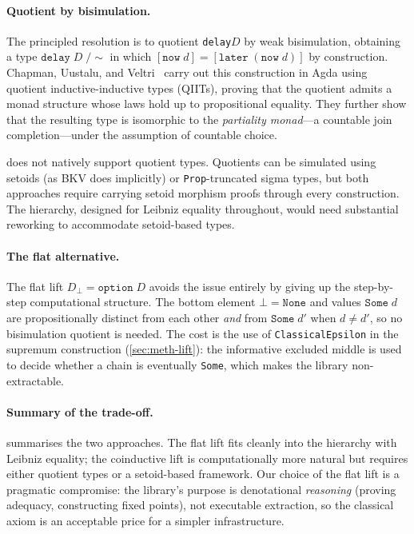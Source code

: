 \paragraph{Quotient by bisimulation.}
The principled resolution is to quotient \texttt{delay}\;$D$ by weak
bisimulation, obtaining a type
$\texttt{delay}\;D\;/\!\sim$ in which
$[\texttt{now}\;d] = [\texttt{later}\;(\texttt{now}\;d)]$ by
construction.
Chapman, Uustalu, and Veltri~\cite{ChapmanUustaluVeltri2019}
carry out this construction in Agda using quotient
inductive-inductive types (QIITs), proving that the quotient admits
a monad structure whose laws hold up to propositional equality.
They further show that the resulting type is isomorphic to the
\emph{partiality monad}---a countable join completion---under the
assumption of countable choice.

\Rocq{} does not natively support quotient types.
Quotients can be simulated using setoids (as BKV does implicitly)
or \texttt{Prop}-truncated sigma types, but both approaches require
carrying setoid morphism proofs through every construction.
The \HB{} hierarchy, designed for Leibniz equality throughout,
would need substantial reworking to accommodate setoid-based types.

\paragraph{The flat alternative.}
The flat lift $D_\bot = \texttt{option}\;D$ avoids the issue entirely
by giving up the step-by-step computational structure.
The bottom element $\bot = \texttt{None}$ and values
$\texttt{Some}\;d$ are propositionally distinct from each other
\emph{and} from $\texttt{Some}\;d'$ when $d \neq d'$, so no
bisimulation quotient is needed.
The cost is the use of \texttt{ClassicalEpsilon} in the supremum
construction (\cref{sec:meth-lift}): the informative excluded middle
is used to decide whether a chain is eventually \texttt{Some}, which
makes the library non-extractable.

\paragraph{Summary of the trade-off.}
 summarises the two approaches.
The flat lift fits cleanly into the \HB{} hierarchy with Leibniz
equality; the coinductive lift is computationally more natural but
requires either quotient types or a setoid-based framework.
Our choice of the flat lift is a pragmatic compromise: the library's
purpose is denotational \emph{reasoning} (proving adequacy,
constructing fixed points), not executable extraction, so the
classical axiom is an acceptable price for a simpler infrastructure.

